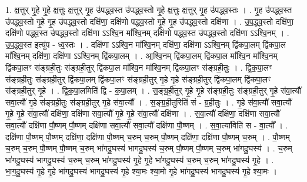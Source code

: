 \documentclass[17pt]{extarticle}
\begin{document}
1. क्ष॒त्तुर् गृ॒हे गृ॒हे क्ष॒त्तुः क्ष॒त्तुर् गृ॒ह उ॑पद्ध्व॒स्त उ॑पद्ध्व॒स्तो गृ॒हे क्ष॒त्तुः क्ष॒त्तुर् गृ॒ह उ॑पद्ध्व॒स्तः । . गृ॒ह उ॑पद्ध्व॒स्त उ॑पद्ध्व॒स्तो गृ॒हे गृ॒ह उ॑पद्ध्व॒स्तो दक्षि॑णा॒ दक्षि॑णो पद्ध्व॒स्तो गृ॒हे गृ॒ह उ॑पद्ध्व॒स्तो दक्षि॑णा । . उ॒प॒द्ध्व॒स्तो दक्षि॑णा॒ दक्षि॑णो पद्ध्व॒स्त उ॑पद्ध्व॒स्तो दक्षि॑णा ऽऽश्वि॒न मा᳚श्वि॒नम् दक्षि॑णो पद्ध्व॒स्त उ॑पद्ध्व॒स्तो दक्षि॑णा ऽऽश्वि॒नम् । . उ॒प॒द्ध्व॒स्त इत्यु॑प - ध्व॒स्तः । . दक्षि॑णा ऽऽश्वि॒न मा᳚श्वि॒नम् दक्षि॑णा॒ दक्षि॑णा ऽऽश्वि॒नम् द्वि॑कपा॒लम् द्वि॑कपा॒ल मा᳚श्वि॒नम् दक्षि॑णा॒ दक्षि॑णा ऽऽश्वि॒नम् द्वि॑कपा॒लम् । . आ॒श्वि॒नम् द्वि॑कपा॒लम् द्वि॑कपा॒ल मा᳚श्वि॒न मा᳚श्वि॒नम् द्वि॑कपा॒लꣳ स॑ङ्ग्रही॒तुः स॑ङ्ग्रही॒तुर् द्वि॑कपा॒ल मा᳚श्वि॒न मा᳚श्वि॒नम् द्वि॑कपा॒लꣳ स॑ङ्ग्रही॒तुः । . द्वि॒क॒पा॒लꣳ स॑ङ्ग्रही॒तुः स॑ङ्ग्रही॒तुर् द्वि॑कपा॒लम् द्वि॑कपा॒लꣳ स॑ङ्ग्रही॒तुर् गृ॒हे गृ॒हे स॑ङ्ग्रही॒तुर् द्वि॑कपा॒लम् द्वि॑कपा॒लꣳ स॑ङ्ग्रही॒तुर् गृ॒हे । . द्वि॒क॒पा॒लमिति॑ द्वि - क॒पा॒लम् । . स॒ङ्ग्र॒ही॒तुर् गृ॒हे गृ॒हे स॑ङ्ग्रही॒तुः स॑ङ्ग्रही॒तुर् गृ॒हे स॑वा॒त्यौ॑ सवा॒त्यौ॑ गृ॒हे स॑ङ्ग्रही॒तुः स॑ङ्ग्रही॒तुर् गृ॒हे स॑वा॒त्यौ᳚ । . स॒ङ्ग्र॒ही॒तुरिति॑ सं - ग्र॒ही॒तुः । . गृ॒हे स॑वा॒त्यौ॑ सवा॒त्यौ॑ गृ॒हे गृ॒हे स॑वा॒त्यौ॑ दक्षि॑णा॒ दक्षि॑णा सवा॒त्यौ॑ गृ॒हे गृ॒हे स॑वा॒त्यौ॑ दक्षि॑णा । . स॒वा॒त्यौ॑ दक्षि॑णा॒ दक्षि॑णा सवा॒त्यौ॑ सवा॒त्यौ॑ दक्षि॑णा पौ॒ष्णम् पौ॒ष्णम् दक्षि॑णा सवा॒त्यौ॑ सवा॒त्यौ॑ दक्षि॑णा पौ॒ष्णम् । . स॒वा॒त्या॑विति॑ स - वा॒त्यौ᳚ । . दक्षि॑णा पौ॒ष्णम् पौ॒ष्णम् दक्षि॑णा॒ दक्षि॑णा पौ॒ष्णम् च॒रुम् च॒रुम् पौ॒ष्णम् दक्षि॑णा॒ दक्षि॑णा पौ॒ष्णम् च॒रुम् । . पौ॒ष्णम् च॒रुम् च॒रुम् पौ॒ष्णम् पौ॒ष्णम् च॒रुम् भा॑गदु॒घस्य॑ भागदु॒घस्य॑ च॒रुम् पौ॒ष्णम् पौ॒ष्णम् च॒रुम् भा॑गदु॒घस्य॑ । . च॒रुम् भा॑गदु॒घस्य॑ भागदु॒घस्य॑ च॒रुम् च॒रुम् भा॑गदु॒घस्य॑ गृ॒हे गृ॒हे भा॑गदु॒घस्य॑ च॒रुम् च॒रुम् भा॑गदु॒घस्य॑ गृ॒हे । . भा॒ग॒दु॒घस्य॑ गृ॒हे गृ॒हे भा॑गदु॒घस्य॑ भागदु॒घस्य॑ गृ॒हे श्या॒मः श्या॒मो गृ॒हे भा॑गदु॒घस्य॑ भागदु॒घस्य॑ गृ॒हे श्या॒मः । \newline
\end{document}
